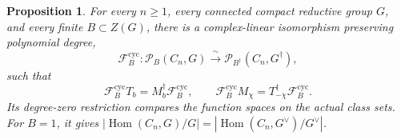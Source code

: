 \documentclass[11pt,a4paper,reqno]{amsart}
\theoremstyle{plain}
\newtheorem{proposition}[theorem]{Proposition}
\theoremstyle{definition}
\theoremstyle{remark}
\numberwithin{equation}{section}
\DeclareMathOperator{\Hom}{Hom}
\newcommand{\cP}{\mathcal P}
\begin{document}
\begin{proposition}\label{prop:cyclic-fourier} For every $n\ge1$, every connected compact reductive group $G$, and every finite $B\subset Z(G)$, there is a complex-linear isomorphism preserving polynomial degree,
\[
\mathcal F^{\mathrm{cyc}}_B\colon\cP_B(C_n,G)\xrightarrow{\ \sim\ }
\cP_{B^\dagger}(C_n,G^\dagger),
\]
such that
\begin{equation}\label{eq:cyclic-fourier-rules}
\mathcal F^{\mathrm{cyc}}_B T_b=M_b^\dagger\mathcal F^{\mathrm{cyc}}_B,
\qquad
\mathcal F^{\mathrm{cyc}}_B M_\chi=T_{-\chi}^\dagger\mathcal F^{\mathrm{cyc}}_B.
\end{equation}
Its degree-zero restriction compares the function spaces on the actual class sets. For $B=1$, it gives $|\Hom(C_n,G)/G|=|\Hom(C_n,G^\vee)/G^\vee|$.
\end{proposition}
\end{document}
